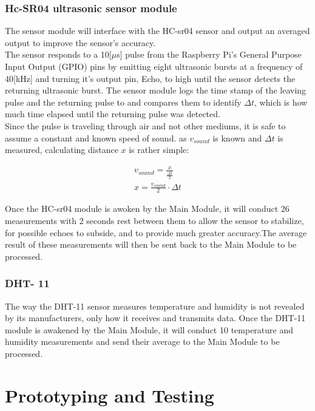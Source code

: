\documentclass[twoside]{ctuthesis}
\theoremstyle{plain}
\theoremstyle{definition}
\theoremstyle{note}
\begin{document}
\subsection{Hc-SR04 ultrasonic sensor module}
The sensor module will interface with the HC-sr04 sensor and output an averaged output to improve the sensor's accuracy.\\
The sensor responds to a 10[$\mu$s] pulse from the Raspberry Pi's General Purpose Input Output (GPIO) pins by emitting eight ultrasonic bursts at a frequency of 40[kHz] and turning it's output pin, Echo, to high until the sensor detects the returning ultrasonic burst. The sensor module logs the time stamp of the leaving pulse and the returning pulse to and compares them to identify $\Delta t$, which is how much time elapsed until the returning pulse was detected.\\

Since the pulse is traveling through air and not other mediums, it is safe to assume a constant and known speed of sound. as $v_{sound}$ is known and $\Delta t$ is measured, calculating distance $x$ is rather simple:

\begin{gather} \nonumber
v_{sound} = \frac{x}{\frac{\Delta t}{2}}\\
x = \frac{v_{sound}}{2}\cdot \Delta t
\end{gather}

Once the HC-sr04 module is awoken by the Main Module, it will conduct 26 measurements with 2 seconds rest between them to allow the sensor to stabilize, for possible echoes to subside, and to provide much greater accuracy.The average result of these measurements will then be sent back to the Main Module to be processed.

\subsection{DHT- 11}
The way the DHT-11 sensor measures temperature and humidity is not revealed by its manufacturers, only how it receives and transmits data. Once the DHT-11 module is awakened by the Main Module, it will conduct 10 temperature and humidity measurements and send their average to the Main Module to be processed.


\pagebreak 

\begingroup
\renewcommand{\cleardoublepage}{}
\renewcommand{\clearpage}{}
\chapter{Prototyping and Testing}
\endgroup
\end{document}

